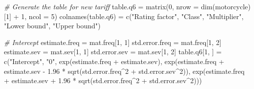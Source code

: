 \documentclass[
]{article}
\newenvironment{Shaded}{\begin{snugshade}}{\end{snugshade}}
\newcommand{\AttributeTok}[1]{\textcolor[rgb]{0.77,0.63,0.00}{#1}}
\newcommand{\CommentTok}[1]{\textcolor[rgb]{0.56,0.35,0.01}{\textit{#1}}}
\newcommand{\DecValTok}[1]{\textcolor[rgb]{0.00,0.00,0.81}{#1}}
\newcommand{\FloatTok}[1]{\textcolor[rgb]{0.00,0.00,0.81}{#1}}
\newcommand{\FunctionTok}[1]{\textcolor[rgb]{0.00,0.00,0.00}{#1}}
\newcommand{\NormalTok}[1]{#1}
\newcommand{\OtherTok}[1]{\textcolor[rgb]{0.56,0.35,0.01}{#1}}
\newcommand{\SpecialCharTok}[1]{\textcolor[rgb]{0.00,0.00,0.00}{#1}}
\newcommand{\StringTok}[1]{\textcolor[rgb]{0.31,0.60,0.02}{#1}}
\begin{document}
\begin{Shaded}
\begin{Highlighting}[]
\CommentTok{\# Generate the table for new tariff}
\NormalTok{table.q6 }\OtherTok{=} \FunctionTok{matrix}\NormalTok{(}\DecValTok{0}\NormalTok{, }\AttributeTok{nrow =} \FunctionTok{dim}\NormalTok{(motorcycle)[}\DecValTok{1}\NormalTok{] }\SpecialCharTok{+} \DecValTok{1}\NormalTok{, }\AttributeTok{ncol =} \DecValTok{5}\NormalTok{)}
\FunctionTok{colnames}\NormalTok{(table.q6) }\OtherTok{=} \FunctionTok{c}\NormalTok{(}\StringTok{"Rating factor"}\NormalTok{, }\StringTok{"Class"}\NormalTok{, }\StringTok{"Multiplier"}\NormalTok{, }\StringTok{"Lower bound"}\NormalTok{, }\StringTok{"Upper bound"}\NormalTok{)}

\CommentTok{\# Intercept}
\NormalTok{estimate.freq }\OtherTok{=}\NormalTok{ mat.freq[}\DecValTok{1}\NormalTok{, }\DecValTok{1}\NormalTok{]}
\NormalTok{std.error.freq }\OtherTok{=}\NormalTok{ mat.freq[}\DecValTok{1}\NormalTok{, }\DecValTok{2}\NormalTok{]}
\NormalTok{estimate.sev }\OtherTok{=}\NormalTok{ mat.sev[}\DecValTok{1}\NormalTok{, }\DecValTok{1}\NormalTok{]}
\NormalTok{std.error.sev }\OtherTok{=}\NormalTok{ mat.sev[}\DecValTok{1}\NormalTok{, }\DecValTok{2}\NormalTok{]}
\NormalTok{table.q6[}\DecValTok{1}\NormalTok{, ] }\OtherTok{=} \FunctionTok{c}\NormalTok{(}\StringTok{"Intercept"}\NormalTok{, }\StringTok{"0"}\NormalTok{, }\FunctionTok{exp}\NormalTok{(estimate.freq }\SpecialCharTok{+}\NormalTok{ estimate.sev), }
                  \FunctionTok{exp}\NormalTok{(estimate.freq }\SpecialCharTok{+}\NormalTok{ estimate.sev }\SpecialCharTok{{-}} \FloatTok{1.96} \SpecialCharTok{*} \FunctionTok{sqrt}\NormalTok{(std.error.freq}\SpecialCharTok{\^{}}\DecValTok{2} \SpecialCharTok{+}\NormalTok{ std.error.sev}\SpecialCharTok{\^{}}\DecValTok{2}\NormalTok{)), }
                  \FunctionTok{exp}\NormalTok{(estimate.freq }\SpecialCharTok{+}\NormalTok{ estimate.sev }\SpecialCharTok{+} \FloatTok{1.96} \SpecialCharTok{*} \FunctionTok{sqrt}\NormalTok{(std.error.freq}\SpecialCharTok{\^{}}\DecValTok{2} \SpecialCharTok{+}\NormalTok{ std.error.sev}\SpecialCharTok{\^{}}\DecValTok{2}\NormalTok{)))}


\end{Highlighting}
\end{Shaded}
\end{document}
